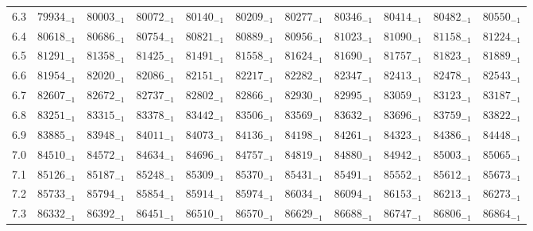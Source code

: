 \documentclass[10pt, a4paper]{article}
\begin{document}
\begin{center}
\begin{longtable}{c || c c c c c | c c c c c}
        6.3 & \({79934}_{-1}\) & \({80003}_{-1}\) & \({80072}_{-1}\) & \({80140}_{-1}\) & \({80209}_{-1}\) & \({80277}_{-1}\) & \({80346}_{-1}\) & \({80414}_{-1}\) & \({80482}_{-1}\) & \({80550}_{-1}\)\\
        6.4 & \({80618}_{-1}\) & \({80686}_{-1}\) & \({80754}_{-1}\) & \({80821}_{-1}\) & \({80889}_{-1}\) & \({80956}_{-1}\) & \({81023}_{-1}\) & \({81090}_{-1}\) & \({81158}_{-1}\) & \({81224}_{-1}\)\\
        6.5 & \({81291}_{-1}\) & \({81358}_{-1}\) & \({81425}_{-1}\) & \({81491}_{-1}\) & \({81558}_{-1}\) & \({81624}_{-1}\) & \({81690}_{-1}\) & \({81757}_{-1}\) & \({81823}_{-1}\) & \({81889}_{-1}\)\\
        6.6 & \({81954}_{-1}\) & \({82020}_{-1}\) & \({82086}_{-1}\) & \({82151}_{-1}\) & \({82217}_{-1}\) & \({82282}_{-1}\) & \({82347}_{-1}\) & \({82413}_{-1}\) & \({82478}_{-1}\) & \({82543}_{-1}\)\\
        6.7 & \({82607}_{-1}\) & \({82672}_{-1}\) & \({82737}_{-1}\) & \({82802}_{-1}\) & \({82866}_{-1}\) & \({82930}_{-1}\) & \({82995}_{-1}\) & \({83059}_{-1}\) & \({83123}_{-1}\) & \({83187}_{-1}\)\\
        6.8 & \({83251}_{-1}\) & \({83315}_{-1}\) & \({83378}_{-1}\) & \({83442}_{-1}\) & \({83506}_{-1}\) & \({83569}_{-1}\) & \({83632}_{-1}\) & \({83696}_{-1}\) & \({83759}_{-1}\) & \({83822}_{-1}\)\\
        6.9 & \({83885}_{-1}\) & \({83948}_{-1}\) & \({84011}_{-1}\) & \({84073}_{-1}\) & \({84136}_{-1}\) & \({84198}_{-1}\) & \({84261}_{-1}\) & \({84323}_{-1}\) & \({84386}_{-1}\) & \({84448}_{-1}\)\\
        7.0 & \({84510}_{-1}\) & \({84572}_{-1}\) & \({84634}_{-1}\) & \({84696}_{-1}\) & \({84757}_{-1}\) & \({84819}_{-1}\) & \({84880}_{-1}\) & \({84942}_{-1}\) & \({85003}_{-1}\) & \({85065}_{-1}\)\\
        7.1 & \({85126}_{-1}\) & \({85187}_{-1}\) & \({85248}_{-1}\) & \({85309}_{-1}\) & \({85370}_{-1}\) & \({85431}_{-1}\) & \({85491}_{-1}\) & \({85552}_{-1}\) & \({85612}_{-1}\) & \({85673}_{-1}\)\\
        7.2 & \({85733}_{-1}\) & \({85794}_{-1}\) & \({85854}_{-1}\) & \({85914}_{-1}\) & \({85974}_{-1}\) & \({86034}_{-1}\) & \({86094}_{-1}\) & \({86153}_{-1}\) & \({86213}_{-1}\) & \({86273}_{-1}\)\\
        7.3 & \({86332}_{-1}\) & \({86392}_{-1}\) & \({86451}_{-1}\) & \({86510}_{-1}\) & \({86570}_{-1}\) & \({86629}_{-1}\) & \({86688}_{-1}\) & \({86747}_{-1}\) & \({86806}_{-1}\) & \({86864}_{-1}\)\\

\end{longtable}
\end{center}
\end{document}
